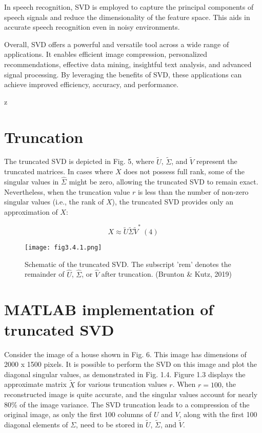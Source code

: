 \documentclass[a4paper]{article}
\begin{document}
{		In speech recognition, SVD is employed to capture the principal components of speech signals and reduce the dimensionality of the feature space. This aids in accurate speech recognition even in noisy environments.
		
		Overall, SVD offers a powerful and versatile tool across a wide range of applications. It enables efficient image compression, personalized recommendations, effective data mining, insightful text analysis, and advanced signal processing. By leveraging the benefits of SVD, these applications can achieve improved efficiency, accuracy, and performance.
		
		z\section{Truncation}
		The truncated SVD is depicted in Fig. 5, where $\tilde{U}$, $\tilde{\Sigma}$, and $\tilde{V}$ represent the truncated matrices. In cases where $X$ does not possess full rank, some of the singular values in $\hat{\Sigma}$ might be zero, allowing the truncated SVD to remain exact. Nevertheless, when the truncation value $r$ is less than the number of non-zero singular values (i.e., the rank of $X$), the truncated SVD provides only an approximation of $X$:
		
		\[ 
		X \approx \tilde{U} \tilde{\Sigma} \tilde{V}^{*} \ (4) 
		\]
		\begin{figure}[H]
			\centering
			\texttt{[image: fig3.4.1.png]}
			\caption[MATLAB output for the previous command line]{Schematic of the truncated SVD. The subscript 'rem' denotes the remainder of $\hat{U}$, $\hat{\Sigma}$, or $\hat{V}$ after truncation. (Brunton \& Kutz, 2019)\protect}
			\label{fig:example}
		\end{figure}
		
		\newpage
		\section{MATLAB implementation of truncated SVD}
		Consider the image of a house shown in Fig. 6. This image has dimensions of 2000 x 1500 pixels. It is possible to perform the SVD on this image and plot the diagonal singular values, as demonstrated in Fig. 1.4. Figure 1.3 displays the approximate matrix $\tilde{X}$ for various truncation values $r$. When $r = 100$, the reconstructed image is quite accurate, and the singular values account for nearly 80\% of the image variance. The SVD truncation leads to a compression of the original image, as only the first 100 columns of $U$ and $V$, along with the first 100 diagonal elements of $\Sigma$, need to be stored in $\tilde{U}$, $\tilde{\Sigma}$, and $\tilde{V}$.
		
}
\end{document}
